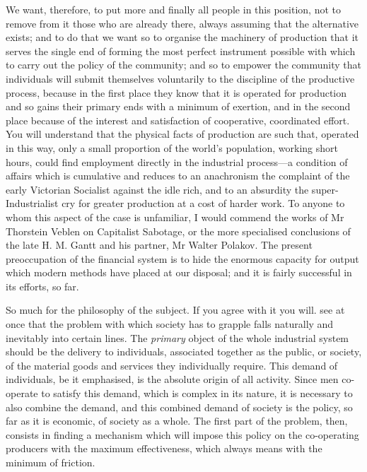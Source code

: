 \documentclass{book}
\begin{document}
We want, therefore, to put more and finally all people in this position, not to remove from it those who are already there, always assuming that the alternative exists; and to do that we want so to organise the machinery of production that it serves the single end of forming the most perfect instrument possible with which to carry out the policy of the community; and so to empower the community that individuals will submit themselves voluntarily to the discipline of the productive process, because in the first place they know that it is operated for production and so gains their primary ends with a minimum of exertion, and in the second place because of the interest and satisfaction of cooperative, coordinated effort. You will understand that the physical facts of production are such that, operated in this way, only a small proportion of the world’s population, working short hours, could find employment directly in the industrial process—a condition of affairs which is cumulative and reduces to an anachronism the complaint of the early Victorian Socialist against the idle rich, and to an absurdity the super-Industrialist cry for greater production at a cost of harder work. To anyone to whom this aspect of the case is unfamiliar, I would commend the works of Mr Thorstein Veblen on Capitalist Sabotage, or the more specialised conclusions of the late H. M. Gantt and his partner, Mr Walter Polakov. The present preoccupation of the financial system is to hide the enormous capacity for output which modern methods have placed at our disposal; and it is fairly successful in its efforts, so far.

So much for the philosophy of the subject. If you agree with it you will. see at once that the problem with which society has to grapple falls naturally and inevitably into certain lines. The \emph{primary} object of the whole industrial system should be the delivery to individuals, associated together as the public, or society, of the material goods and services they individually require. This demand of individuals, be it emphasised, is the absolute origin of all activity. Since men co-operate to satisfy this demand, which is complex in its nature, it is necessary to also combine the demand, and this combined demand of society is the policy, so far as it is economic, of society as a whole. The first part of the problem, then, consists in finding a mechanism which will impose this policy on the co-operating producers with the maximum effectiveness, which always means with the minimum of friction.
\end{document}
